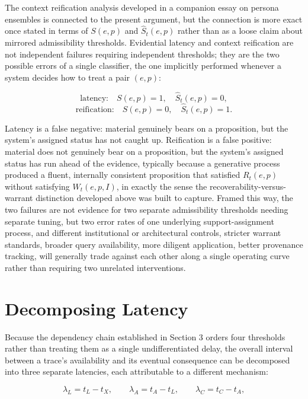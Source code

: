 \documentclass[11pt]{article}
\begin{document}
The context reification analysis developed in a companion essay on persona ensembles is connected to the present argument, but the connection is more exact once stated in terms of $S(e,p)$ and $\widehat S_t(e,p)$ rather than as a loose claim about mirrored admissibility thresholds. Evidential latency and context reification are not independent failures requiring independent thresholds; they are the two possible errors of a single classifier, the one implicitly performed whenever a system decides how to treat a pair $(e,p)$:

\[
\text{latency:} \quad S(e,p) = 1, \quad \widehat S_t(e,p) = 0,
\]
\[
\text{reification:} \quad S(e,p) = 0, \quad \widehat S_t(e,p) = 1.
\]

Latency is a false negative: material genuinely bears on a proposition, but the system's assigned status has not caught up. Reification is a false positive: material does not genuinely bear on a proposition, but the system's assigned status has run ahead of the evidence, typically because a generative process produced a fluent, internally consistent proposition that satisfied $R_t(e,p)$ without satisfying $W_t(e,p,I)$, in exactly the sense the recoverability-versus-warrant distinction developed above was built to capture. Framed this way, the two failures are not evidence for two separate admissibility thresholds needing separate tuning, but two error rates of one underlying support-assignment process, and different institutional or architectural controls, stricter warrant standards, broader query availability, more diligent application, better provenance tracking, will generally trade against each other along a single operating curve rather than requiring two unrelated interventions.

\section{Decomposing Latency}

Because the dependency chain established in Section 3 orders four thresholds rather than treating them as a single undifferentiated delay, the overall interval between a trace's availability and its eventual consequence can be decomposed into three separate latencies, each attributable to a different mechanism:

\[
\lambda_L = t_L - t_X, \qquad \lambda_A = t_A - t_L, \qquad \lambda_C = t_C - t_A,
\]
\end{document}
